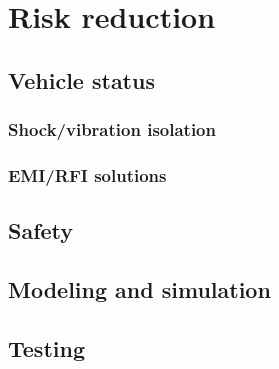 \section*{Risk reduction} \label{sec:risk}

\subsection*{Vehicle status}\label{sec:risk-vehicle}

\subsubsection*{Shock/vibration isolation}



\subsubsection*{EMI/RFI solutions}




\subsection*{Safety} \label{subsec:risk-safety}




\subsection*{Modeling and simulation} \label{subsec:risk-modelsim}




\subsection*{Testing} \label{subsec:risk-test}

